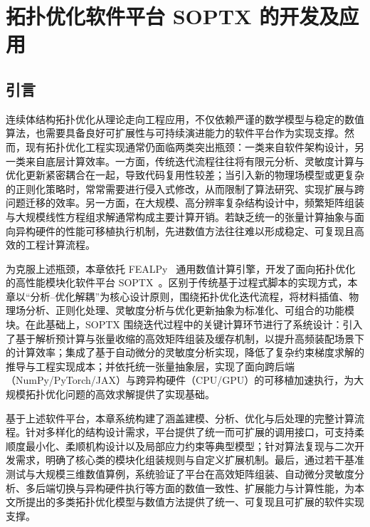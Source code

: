 \chapter{拓扑优化软件平台 SOPTX 的开发及应用}
\label{chap:soptx}


\section{引言}
\label{sec:soptx:intro}

连续体结构拓扑优化从理论走向工程应用，不仅依赖严谨的数学模型与稳定的数值算法，也需要具备良好可扩展性与可持续演进能力的软件平台作为实现支撑。然而，现有拓扑优化工程实现通常仍面临两类突出瓶颈：一类来自软件架构设计，另一类来自底层计算效率。一方面，传统迭代流程往往将有限元分析、灵敏度计算与优化更新紧密耦合在一起，导致代码复用性较差；当引入新的物理场模型或更复杂的正则化策略时，常常需要进行侵入式修改，从而限制了算法研究、实现扩展与跨问题迁移的效率。另一方面，在大规模、高分辨率复杂结构设计中，频繁矩阵组装与大规模线性方程组求解通常构成主要计算开销。若缺乏统一的张量计算抽象与面向异构硬件的性能可移植执行机制，先进数值方法往往难以形成稳定、可复现且高效的工程计算流程。

为克服上述瓶颈，本章依托 FEALPy~\cite{fealpy, zhengFEALPyV3Crossplatform2025a} 通用数值计算引擎，开发了面向拓扑优化的高性能模块化软件平台 SOPTX~\cite{heSOPTXHighperformanceMultibackend2025a}。区别于传统基于过程式脚本的实现方式，本章以“分析{--}优化解耦”为核心设计原则，围绕拓扑优化迭代流程，将材料插值、物理场分析、正则化处理、灵敏度分析与优化更新抽象为标准化、可组合的功能模块。在此基础上，SOPTX 围绕迭代过程中的关键计算环节进行了系统设计：引入了基于解析预计算与张量收缩的高效矩阵组装及缓存机制，以提升高频装配场景下的计算效率；集成了基于自动微分的灵敏度分析实现，降低了复杂约束梯度求解的推导与工程实现成本；并依托统一张量抽象层，实现了面向跨后端（NumPy/PyTorch/JAX）与跨异构硬件（CPU/GPU）的可移植加速执行，为大规模拓扑优化问题的高效求解提供了实现基础。

基于上述软件平台，本章系统构建了涵盖建模、分析、优化与后处理的完整计算流程。针对多样化的结构设计需求，平台提供了统一而可扩展的调用接口，可支持柔顺度最小化、柔顺机构设计以及局部应力约束等典型模型；针对算法复现与二次开发需求，明确了核心类的模块化组装规则与自定义扩展机制。最后，通过若干基准测试与大规模三维数值算例，系统验证了平台在高效矩阵组装、自动微分灵敏度分析、多后端切换与异构硬件执行等方面的数值一致性、扩展能力与计算性能，为本文所提出的多类拓扑优化模型与数值方法提供了统一、可复现且可扩展的软件实现支撑。


